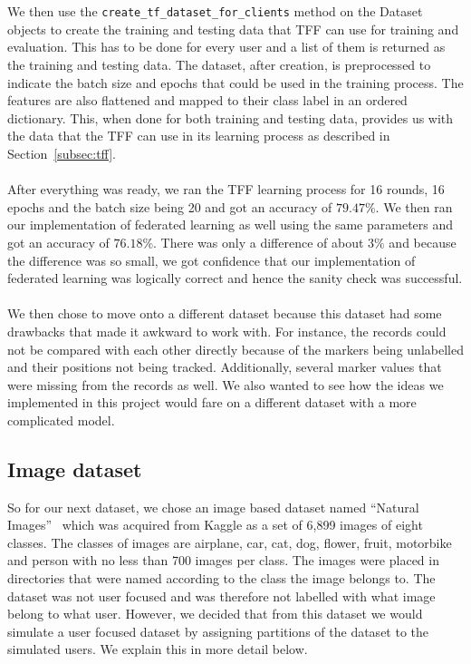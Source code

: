 \documentclass[12pt]{article}
\begin{document}
\\\\
We then use the \texttt{create\_tf\_dataset\_for\_clients} method on the Dataset objects to create the training and testing data that TFF can use for training and evaluation. This has to be done for every user and a list of them is returned as the training and testing data. The dataset, after creation, is preprocessed to indicate the batch size and epochs that could be used in the training process. The features are also flattened and mapped to their class label in an ordered dictionary. This, when done for both training and testing data, provides us with the data that the TFF can use in its learning process as described in Section~\ref{subsec:tff}.
\\\\
After everything was ready, we ran the TFF learning process for 16 rounds, 16 epochs and the batch size being 20 and got an accuracy of $79.47\%$. We then ran our implementation of federated learning as well using the same parameters and got an accuracy of $76.18\%$. There was only a difference of about $3\%$ and because the difference was so small, we got confidence that our implementation of federated learning was logically correct and hence the sanity check was successful. 
\\\\
We then chose to move onto a different dataset because this dataset had some drawbacks that made it awkward to work with. For instance, the records could not be compared with each other directly because of the markers being unlabelled and their positions not being tracked. Additionally, several marker values that were missing from the records as well. We also wanted to see how the ideas we implemented in this project would fare on a different dataset with a more complicated model.
\subsection{Image dataset}\label{subsec:imageset}
So for our next dataset, we chose an image based dataset named ``Natural Images''~\cite{roy2018effects} which was acquired from Kaggle as a set of 6,899 images of eight classes. The classes of images are airplane, car, cat, dog, flower, fruit, motorbike and person with no less than 700 images per class. The images were placed in directories that were named according to the class the image belongs to. The dataset was not user focused and was therefore not labelled with what image belong to what user. However, we decided that from this dataset we would simulate a user focused dataset by assigning partitions of the dataset to the simulated users. We explain this in more detail below. 
\end{document}
